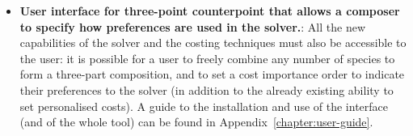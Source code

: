 \begin{itemize}
    \item \textbf{User interface for three-point counterpoint that allows a composer to specify how preferences are used in the solver.}: All the new capabilities of the solver and the costing techniques must also be accessible to the user: it is possible for a user to freely combine any number of species to form a three-part composition, and to set a cost importance order to indicate their preferences to the solver (in addition to the already existing ability to set personalised costs). A guide to the installation and use of the interface (and of the whole tool) can be found in Appendix~\ref{chapter:user-guide}.
\end{itemize}


